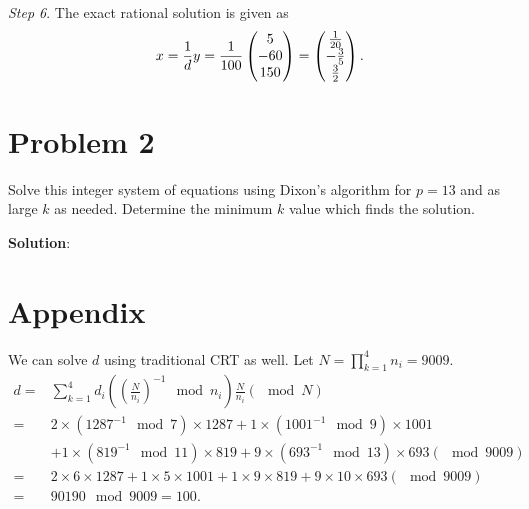 \documentclass[12pt]{article}
\theoremstyle{plain}
\begin{document}
\emph{Step 6}. The exact rational solution is given as
$$x=\frac{1}{d}y = \frac{1}{100} \begin{pmatrix}5 \\ -60 \\ 150\end{pmatrix} = \begin{pmatrix}\frac{1}{20} \\ -\frac{3}{5} \\ \frac{3}{2}\end{pmatrix}.$$

\section{Problem 2}
Solve this integer system of equations using Dixon’s algorithm for $p = 13$ and as large $k$ as needed. Determine the minimum $k$ value which
finds the solution.

{\bf Solution}:



\section{Appendix}
We can solve $d$ using traditional CRT as well. 
Let $N = \prod_{k=1}^4 n_i = 9009$.
$$\begin{aligned}
d =& \sum_{k=1}^4 d_i \left(\left(\frac{N}{n_i}\right)^{-1} \mod n_i \right) \frac{N}{n_i}  (\mod N)\\
=& 2\times(1287^{-1} \mod 7)\times 1287 + 1\times(1001^{-1} \mod 9)\times 1001 \\
&+ 1\times(819^{-1} \mod 11)\times 819 + 9\times(693^{-1} \mod 13)\times 693 (\mod 9009)\\
=& 2\times 6\times 1287 + 1\times 5\times 1001 + 1\times 9\times 819 + 9\times 10\times 693 (\mod 9009)\\
=& 90190 \mod 9009 = 100.
\end{aligned}$$
\end{document}
